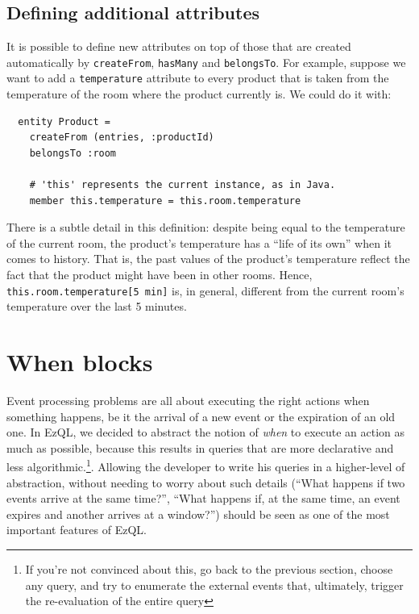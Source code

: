 \subsection{Defining additional attributes}

It is possible to define new attributes on top of those that are
created automatically by \verb=createFrom=, \verb=hasMany= and
\verb=belongsTo=. For example, suppose we want to add a
\verb=temperature= attribute to every product that is taken from the
temperature of the room where the product currently is. We could do it
with:

\begin{lstlisting}
  entity Product =
    createFrom (entries, :productId)
    belongsTo :room

    # 'this' represents the current instance, as in Java.
    member this.temperature = this.room.temperature

\end{lstlisting}

There is a subtle detail in this definition: despite being equal to
the temperature of the current room, the product's temperature has a
``life of its own'' when it comes to history. That is, the past values
of the product's temperature reflect the fact that the product might
have been in other rooms. Hence, \verb=this.room.temperature[5 min]=
is, in general, different from the current room's temperature over the
last 5 minutes.

\section{When blocks}

Event processing problems are all about executing the right actions
when something happens, be it the arrival of a new event or the
expiration of an old one. In EzQL, we decided to abstract the notion
of \emph{when} to execute an action as much as possible, because this
results in queries that are more declarative and less
algorithmic.\footnote{If you're not convinced about this, go back to
  the previous section, choose any query, and try to enumerate the
  external events that, ultimately, trigger the re-evaluation of the
  entire query}. Allowing the developer to write his queries in a
higher-level of abstraction, without needing to worry about such
details (``What happens if two events arrive at the same time?'',
``What happens if, at the same time, an event expires and another
arrives at a window?'')  should be seen as one of the most important
features of EzQL.

